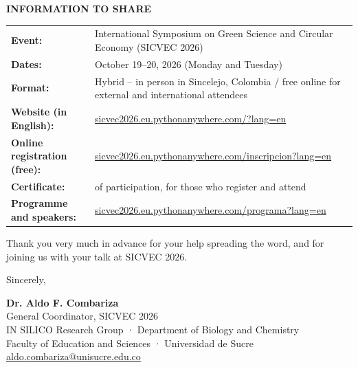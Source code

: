 \documentclass[11pt,a4paper]{article}
\begin{document}
\vspace{0.1cm}

\noindent
\textbf{INFORMATION TO SHARE}

\begin{tabularx}{\linewidth}{@{}l X@{}}
\textbf{Event:} & International Symposium on Green Science and Circular Economy (SICVEC 2026) \\
\textbf{Dates:} & October 19--20, 2026 (Monday and Tuesday) \\
\textbf{Format:} & Hybrid -- in person in Sincelejo, Colombia / free online for external and international attendees \\
\textbf{Website (in English):} & \href{https://sicvec2026.eu.pythonanywhere.com/?lang=en}{sicvec2026.eu.pythonanywhere.com/?lang=en} \\
\textbf{Online registration (free):} & \href{https://sicvec2026.eu.pythonanywhere.com/inscripcion?lang=en}{sicvec2026.eu.pythonanywhere.com/inscripcion?lang=en} \\
\textbf{Certificate:} & of participation, for those who register and attend \\
\textbf{Programme and speakers:} & \href{https://sicvec2026.eu.pythonanywhere.com/programa?lang=en}{sicvec2026.eu.pythonanywhere.com/programa?lang=en} \\
\end{tabularx}

\vspace{0.1cm}

Thank you very much in advance for your help spreading the word, and for joining us with your talk at SICVEC 2026.

\vspace{0.15cm}

Sincerely,

\vspace{0.15cm}

\textbf{Dr. Aldo F. Combariza}\\
General Coordinator, SICVEC 2026\\
IN SILICO Research Group · Department of Biology and Chemistry\\
Faculty of Education and Sciences · Universidad de Sucre\\
\href{mailto:aldo.combariza@unisucre.edu.co}{aldo.combariza@unisucre.edu.co}
\end{document}
